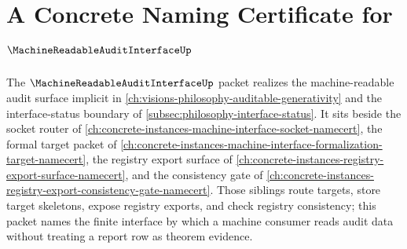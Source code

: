 \chapter{A Concrete Naming Certificate for $\MachineReadableAuditInterfaceUp$}
\label{ch:concrete-instances-machine-readable-audit-interface-namecert}

The $\MachineReadableAuditInterfaceUp$ packet realizes the machine-readable audit surface implicit in \autoref{ch:visions-philosophy-auditable-generativity} and the interface-status boundary of \autoref{subsec:philosophy-interface-status}. It sits beside the socket router of \autoref{ch:concrete-instances-machine-interface-socket-namecert}, the formal target packet of \autoref{ch:concrete-instances-machine-interface-formalization-target-namecert}, the registry export surface of \autoref{ch:concrete-instances-registry-export-surface-namecert}, and the consistency gate of \autoref{ch:concrete-instances-registry-export-consistency-gate-namecert}. Those siblings route targets, store target skeletons, expose registry exports, and check registry consistency; this packet names the finite interface by which a machine consumer reads audit data without treating a report row as theorem evidence.

